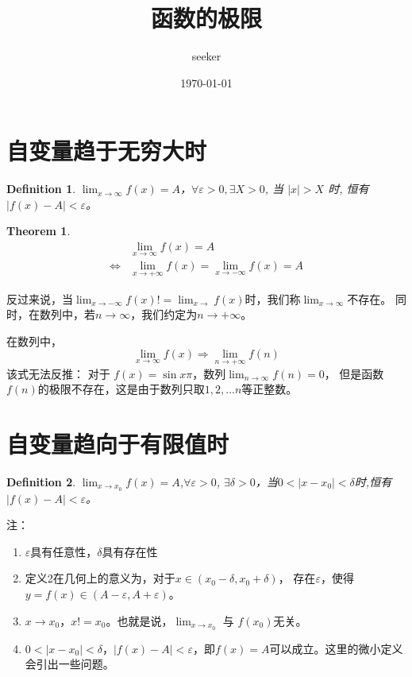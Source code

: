 \documentclass[UTF8]{ctexart}
\title{函数的极限}
\author{seeker}
\date{\today}
\newtheorem{definition}{Definition}
\newtheorem{theorem}{Theorem}
\begin{document}
	\maketitle
	\section{自变量趋于无穷大时}
	\begin{definition}
		$\lim _{x \rightarrow \infty} f(x)=A$，$\forall \varepsilon>0, \exists X>0$, 当 $|x|>X$ 时, 恒有 $|f(x)-A|<\varepsilon$。
	\end{definition}
	
	\begin{theorem}
		\begin{equation}
			\begin{split}
				&\lim _{x\rightarrow \infty}f(x)=A \\
				\Leftrightarrow 
				&\lim _{x\rightarrow + \infty}f(x)
				=\lim _{x\rightarrow - \infty}f(x)=A
			\end{split}
		\end{equation}
	\end{theorem}


	反过来说，当$\lim _{x \rightarrow -\infty}f(x)!=\lim _{x \rightarrow}f(x)$时，我们称$\lim_{x \rightarrow \infty}$不存在。
	同时，在数列中，若$n\rightarrow \infty$，我们约定为$n\rightarrow +\infty$。
	
	在数列中，
	$$\lim _{x\rightarrow \infty}f(x) \Rightarrow \lim _{n\rightarrow +\infty}f(n)$$
	该式无法反推：
	对于 $f(x)=\sin{x\pi}$，数列$\lim _{n\rightarrow\infty}f(n)=0$，
	但是函数$f(n)$的极限不存在，这是由于数列只取$1,2,...n$等正整数。
	
	\section{自变量趋向于有限值时}
	\begin{definition}
		$\lim _{x\rightarrow x_0}f(x)=A$,$\forall \varepsilon > 0$,
		$\exists \delta > 0$，当$0<|x-x_0|<\delta$时,恒有$|f(x)-A|<\varepsilon$。
	\end{definition}
	
	注：
	\begin{enumerate}
		\item $\varepsilon$具有任意性，$\delta$具有存在性
		\item 定义2在几何上的意义为，对于$x \in (x_0-\delta,x_0+\delta)$，
		存在$\varepsilon$，使得$y=f(x)\in (A-\varepsilon,A+\varepsilon)$。
		\item $x\rightarrow x_0$，$x!=x_0$。也就是说，$\lim _{x\rightarrow x_0}$ 与 $f(x_0)$无关。
		\item $0<|x-x_0|<\delta$，$|f(x)-A|<\varepsilon$，即$f(x)=A$可以成立。这里的微小定义会引出一些问题。
		
	\end{enumerate}
\end{document}
